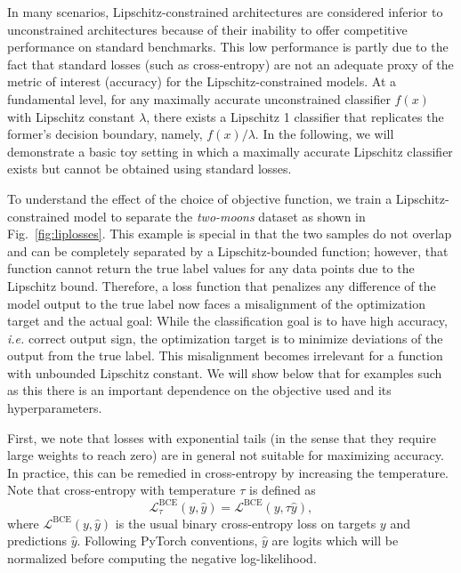 \documentclass{article}
\begin{document}
In many scenarios, Lipschitz-constrained architectures are considered inferior to unconstrained architectures because of their inability to offer competitive performance on standard benchmarks. This low performance is partly due to the fact that standard losses (such as cross-entropy) are not an adequate proxy of the metric of interest (accuracy) for the Lipschitz-constrained models. At a fundamental level, for any maximally accurate unconstrained classifier $f(x)$ with Lipschitz constant $\lambda$, there exists a Lipschitz 1 classifier that replicates the former's decision boundary, namely, $f(x)/\lambda$. In the following, we will demonstrate a basic toy setting in which a maximally accurate Lipschitz classifier exists but cannot be obtained using standard losses. 

To understand the effect of the choice of objective function, we train a Lipschitz-constrained model to separate the {\em two-moons} dataset as shown in Fig.~\ref{fig:liplosses}. 
This example is special in that the two samples do not overlap and can be completely separated by a Lipschitz-bounded function; however, that function cannot return the true label values for any data points due to the Lipschitz bound. 
Therefore, a loss function that penalizes any difference of the model output to the true label now faces a misalignment of the optimization target and the actual goal:
While the classification goal is to have high accuracy, {\em i.e.} correct output sign, the optimization target is to minimize deviations of the output from the true label.
This misalignment becomes irrelevant for a function with unbounded Lipschitz constant.
We will show below that for examples such as this there is an important dependence on the objective used and its hyperparameters. 

First, we note that losses with exponential tails (in the sense that they require large weights to reach zero) are in general not suitable for maximizing accuracy. In practice, this can be remedied in cross-entropy by increasing the temperature. Note that cross-entropy with temperature $\tau$ is defined as
\begin{equation}
    \mathcal{L}^{\mathrm{BCE}}_\tau(y, \hat{y}) = \mathcal{L}^{\mathrm{BCE}}(y, \tau \hat{y}),
\end{equation}
where $\mathcal{L}^{\mathrm{BCE}}(y, \hat{y})$ is the usual binary cross-entropy loss on targets $y$ and predictions $\hat{y}$. Following PyTorch conventions, $\hat y$ are logits which will be normalized before computing the negative log-likelihood.
\end{document}
